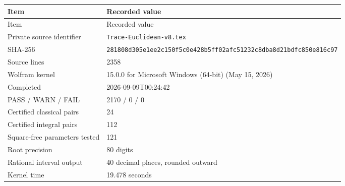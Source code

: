 {\small
\begin{longtable}{@{}p{46mm}p{108mm}@{}}
\toprule
Item & Recorded value \\
\midrule\endfirsthead
\toprule
Item & Recorded value \\
\midrule\endhead
\bottomrule\endfoot
Private source identifier & \nolinkurl{Trace-Euclidean-v8.tex} \\
SHA-256 & \nolinkurl{281808d305e1ee2c150f5c0e428b5ff02afc51232c8dba8d21bdfc850e816c97} \\
Source lines & 2358 \\
Wolfram kernel & 15.0.0 for Microsoft Windows (64-bit) (May 15, 2026) \\
Completed & 2026-09-09T00:24:42 \\
PASS / WARN / FAIL & 2170 / 0 / 0 \\
Certified classical pairs & 24 \\
Certified integral pairs & 112 \\
Square-free parameters tested & 121 \\
Root precision & 80 digits \\
Rational interval output & 40 decimal places, rounded outward \\
Kernel time & 19.478 seconds \\
\end{longtable}
}
